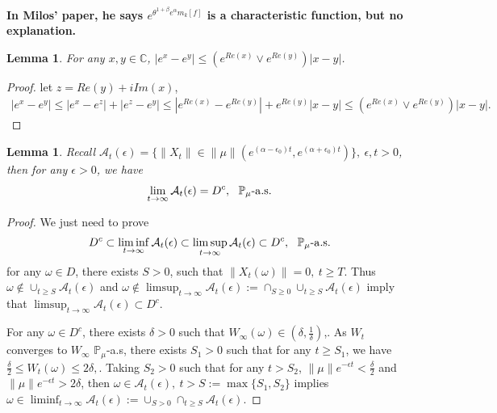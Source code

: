 \documentclass[12pt,oneside,english]{amsart}
\theoremstyle{plain}
\newtheorem{lem}[thm]{Lemma}
\theoremstyle{definition}
\numberwithin{equation}{section}
\begin{document}
{\bf In Milos' paper, he says $e^{\theta^{1+\beta}e^{\alpha}m_k[f]}$ is a characteristic function, but no explanation.}
\begin{lem}\label{lemma31}
For any $x,y\in \mathbb{C}$, $|e^x-e^y|\leq (e^{Re(x)}\vee e^{Re(y)})|x-y|$.
\end{lem}
\begin{proof}
let $z=Re(y)+iIm(x)$,
\begin{align}\label{estim}
    |e^x-e^y|\leq|e^x-e^z|+|e^z-e^y|\leq |e^{Re(x)}-e^{Re(y)}|+e^{Re(y)}|x-y|\leq (e^{Re(x)}\vee e^{Re(y)})|x-y|.
\end{align}
\end{proof}
\begin{lem}\label{lemma32}
Recall $\mathcal{A}_t(\epsilon)=\{\|X_t\|\in\|\mu\|(e^{(\alpha-\epsilon_0)t},e^{(\alpha+\epsilon_0)t})\},~\epsilon,t>0$, then for any $\epsilon>0$, we have
\begin{align}
    \lim_{t\rightarrow\infty}\mathcal{A}_t(\epsilon)=D^c, ~~\mathbb{P}_{\mu}\text{-}{\rm a.s}.
\end{align}
\end{lem}
\begin{proof}
    We just need to prove 
    \begin{align}
        D^c \subset \liminf_{t\rightarrow\infty}\mathcal{A}_t(\epsilon)\subset \limsup_{t\rightarrow\infty}\mathcal{A}_t(\epsilon)\subset D^c,~~\mathbb{P}_{\mu}\text{-}{\rm a.s}.
    \end{align}
    for any $\omega\in D$, there exists $S>0$, such that $\|X_t(\omega)\|=0,~t\geq T$. Thus $\omega \notin \cup_{t\geq S}\mathcal{A}_t(\epsilon)$ and $\omega\notin  \limsup_{t\rightarrow\infty}\mathcal{A}_t(\epsilon):=\cap_{S\geq 0}\cup_{t\geq S}\mathcal{A}_t(\epsilon)$ imply that $\limsup_{t\rightarrow\infty}\mathcal{A}_t(\epsilon)\subset D^c$.
    
    For any $\omega \in D^c$, there exists $\delta>0$ such that $W_{\infty}(\omega)\in(\delta,\frac{1}{\delta})$,. As $W_t$ converges to $W_{\infty}$ $\mathbb{P}_{\mu}$-a.s, there exists $S_1>0$ such that for any $t\geq S_1$, we have $\frac{\delta}{2}\leq W_t(\omega)\leq 2\delta,$. Taking $S_2>0$ such that for any $t>S_2$, $\|\mu\|e^{-\epsilon t}<\frac{\delta}{2}$ and $\|\mu\|e^{-\epsilon t}>2\delta$, then $\omega\in \mathcal{A}_t(\epsilon),~t>S:=\max\{S_1,S_2\}$ implies $\omega \in \liminf_{t\rightarrow \infty}\mathcal{A}_t(\epsilon):=\cup_{S>0}\cap_{t\geq S}\mathcal{A}_t(\epsilon)$.
\end{proof}
\end{document}
